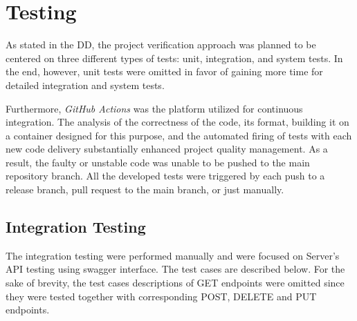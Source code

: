 \chapter{Testing} \label{ch:testing}

As stated in the DD, the project verification approach was planned to be centered on three different types of tests: unit, integration, and system tests. In the end, however, unit tests were omitted in favor of gaining more time for detailed integration and system tests.

Furthermore, \textit{GitHub Actions} was the platform utilized for continuous integration. The analysis of the correctness of the code, its format, building it on a container designed for this purpose, and the automated firing of tests with each new code delivery substantially enhanced project quality management. As a result, the faulty or unstable code was unable to be pushed to the main repository branch. All the developed tests were triggered by each push to a release branch, pull request to the main branch, or just manually.

\section{Integration Testing}
The integration testing were performed manually and were focused on Server's API testing using swagger interface. The test cases are described below. For the sake of brevity, the test cases descriptions of GET endpoints were omitted since they were tested together with corresponding POST, DELETE and PUT endpoints.

